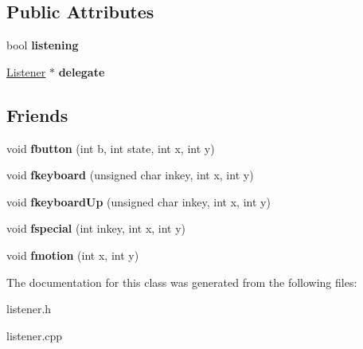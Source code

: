 \subsection*{Public Attributes}
\begin{DoxyCompactItemize}
\item 
\hypertarget{classg2c_1_1_listener_aa605575ed8d272655e618be0f8463675}{
bool {\bfseries listening}}
\label{classg2c_1_1_listener_aa605575ed8d272655e618be0f8463675}

\item 
\hypertarget{classg2c_1_1_listener_aaea6e353d83b25ed0b7673ef0406fea5}{
\hyperlink{classg2c_1_1_listener}{Listener} $\ast$ {\bfseries delegate}}
\label{classg2c_1_1_listener_aaea6e353d83b25ed0b7673ef0406fea5}

\end{DoxyCompactItemize}
\subsection*{Friends}
\begin{DoxyCompactItemize}
\item 
\hypertarget{classg2c_1_1_listener_aa55d6a52cb291992faebd7b17f6acbcb}{
void {\bfseries fbutton} (int b, int state, int x, int y)}
\label{classg2c_1_1_listener_aa55d6a52cb291992faebd7b17f6acbcb}

\item 
\hypertarget{classg2c_1_1_listener_a92301e62a12c669be2d2c795276d6281}{
void {\bfseries fkeyboard} (unsigned char inkey, int x, int y)}
\label{classg2c_1_1_listener_a92301e62a12c669be2d2c795276d6281}

\item 
\hypertarget{classg2c_1_1_listener_a0aae4450276dc799a287d620b5ef764f}{
void {\bfseries fkeyboardUp} (unsigned char inkey, int x, int y)}
\label{classg2c_1_1_listener_a0aae4450276dc799a287d620b5ef764f}

\item 
\hypertarget{classg2c_1_1_listener_ac92c967f282d0643e4dbe6421a7cc7d3}{
void {\bfseries fspecial} (int inkey, int x, int y)}
\label{classg2c_1_1_listener_ac92c967f282d0643e4dbe6421a7cc7d3}

\item 
\hypertarget{classg2c_1_1_listener_a1754b0ecd84c8a61804a58297e6deb61}{
void {\bfseries fmotion} (int x, int y)}
\label{classg2c_1_1_listener_a1754b0ecd84c8a61804a58297e6deb61}

\end{DoxyCompactItemize}


The documentation for this class was generated from the following files:\begin{DoxyCompactItemize}
\item 
listener.h\item 
listener.cpp\end{DoxyCompactItemize}
